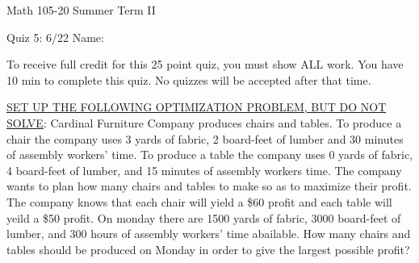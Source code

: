 \documentclass[11pt,epsfig]{article}
\begin{document}
Math 105-20 Summer Term II 

Quiz 5: 6/22 \hspace{1.9in} {Name:} {\underline {\hspace{3.5in}}}
\vspace{2pc}

To receive full credit for this 25 point quiz, you must show ALL work. You have 10 min to complete this quiz. No quizzes will be accepted after that time.
\vspace{2pc}

\begin{problem}{25}
\newline \underline{SET UP THE FOLLOWING OPTIMIZATION PROBLEM, BUT DO NOT SOLVE}:
\newline\newline
Cardinal Furniture Company produces chairs and tables. To produce a chair the company uses 3 yards of fabric, 2 board-feet of lumber and 30 minutes of assembly workers' time. To produce a table the company uses 0 yards of fabric, 4 board-feet of lumber, and 15 minutes of assembly workers time.  The company wants to plan how many chairs and tables to make so as to maximize their profit. The company knows that each chair will yield a \$60 profit and each table will yeild a \$50 profit. On monday there are 1500 yards of fabric, 3000 board-feet of lumber, and 300 hours of assembly workers' time abailable. How many chairs and tables should be produced on Monday in order to give the largest possible profit? 

\vfill
\end{problem}



\showpoints
\end{document}
